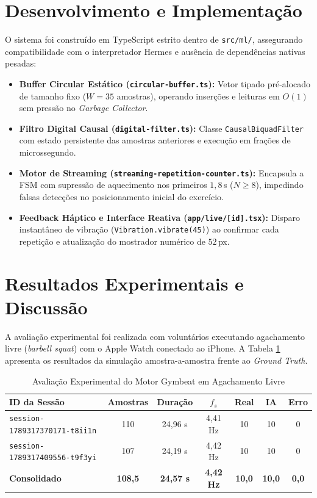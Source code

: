 \documentclass[12pt]{article}
\begin{document}
\section{Desenvolvimento e Implementação}

O sistema foi construído em TypeScript estrito dentro de \texttt{src/ml/}, assegurando compatibilidade com o interpretador Hermes e ausência de dependências nativas pesadas:
\begin{itemize}
    \item \textbf{Buffer Circular Estático (\texttt{circular-buffer.ts}):} Vetor tipado pré-alocado de tamanho fixo ($W = 35$ amostras), operando inserções e leituras em $O(1)$ sem pressão no \textit{Garbage Collector}.
    \item \textbf{Filtro Digital Causal (\texttt{digital-filter.ts}):} Classe \texttt{CausalBiquadFilter} com estado persistente das amostras anteriores e execução em frações de microssegundo.
    \item \textbf{Motor de Streaming (\texttt{streaming-repetition-counter.ts}):} Encapsula a FSM com supressão de aquecimento nos primeiros $1{,}8\,$s ($N \ge 8$), impedindo falsas detecções no posicionamento inicial do exercício.
    \item \textbf{Feedback Háptico e Interface Reativa (\texttt{app/live/[id].tsx}):} Disparo instantâneo de vibração (\texttt{Vibration.vibrate(45)}) ao confirmar cada repetição e atualização do mostrador numérico de $52\,$px.
\end{itemize}

\section{Resultados Experimentais e Discussão}

A avaliação experimental foi realizada com voluntários executando agachamento livre (\textit{barbell squat}) com o Apple Watch conectado ao iPhone. A Tabela \ref{tab:resultados} apresenta os resultados da simulação amostra-a-amostra frente ao \textit{Ground Truth}.

\begin{table}[ht]
\centering
\caption{Avaliação Experimental do Motor Gymbeat em Agachamento Livre}
\label{tab:resultados}
\begin{tabular}{lcccccc}
\toprule
\textbf{ID da Sessão} & \textbf{Amostras} & \textbf{Duração} & \textbf{$f_s$} & \textbf{Real} & \textbf{IA} & \textbf{Erro} \\
\midrule
\texttt{session-1789317370171-t8ii1n} & 110 & 24,96 s & 4,41 Hz & 10 & 10 & 0 \\
\texttt{session-1789317409556-t9f3yi} & 107 & 24,19 s & 4,42 Hz & 10 & 10 & 0 \\
\midrule
\textbf{Consolidado} & \textbf{108,5} & \textbf{24,57 s} & \textbf{4,42 Hz} & \textbf{10,0} & \textbf{10,0} & \textbf{0,0} \\
\bottomrule
\end{tabular}
\end{table}
\end{document}
